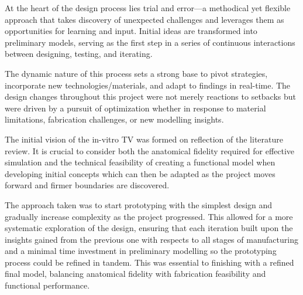 At the heart of the design process lies trial and error—a methodical yet flexible approach that takes discovery of unexpected challenges and leverages them as opportunities for learning and input. Initial ideas are transformed into preliminary models, serving as the first step in a series of continuous interactions between designing, testing, and iterating.

The dynamic nature of this process sets a strong base to pivot strategies, incorporate new technologies/materials, and adapt to findings in real-time. The design changes throughout this project were not merely reactions to setbacks but were driven by a pursuit of optimization whether in response to material limitations, fabrication challenges, or new modelling insights.


\mynewline
The initial vision of the in-vitro \gls{TV} was formed on reflection of the literature review. It is crucial to consider both the anatomical fidelity required for effective simulation and the technical feasibility of creating a functional model when developing initial concepts which can then be adapted as the project moves forward and firmer boundaries are discovered.

The approach taken was to start prototyping with the simplest design and gradually increase complexity as the project progressed. This allowed for a more systematic exploration of the design, ensuring that each iteration built upon the insights gained from the previous one with respects to all stages of manufacturing and a minimal time investment in preliminary modelling so the prototyping process could be refined in tandem. This was essential to finishing with a refined final model, balancing anatomical fidelity with fabrication feasibility and functional performance.

